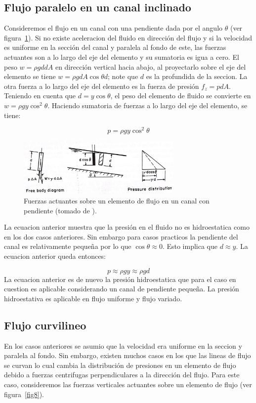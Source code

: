 \documentclass[11pt, oneside]{article}
\begin{document}
\subsection{Flujo paralelo en un canal inclinado}
Consideremos el flujo en un canal con una pendiente dada por el angulo $\theta$ (ver figura~\ref{fig7}). Si no existe aceleracion del fluido en direcci\'on del flujo y si la velocidad es uniforme en la secci\'on del canal y paralela al fondo de este, las fuerzas actuantes son a lo largo del eje del elemento y su sumatoria es igua a cero. El peso  $w=\rho g d dA$ en direcci\'on vertical hacia abajo, al proyectarlo sobre el eje del elemento se tiene $w=\rho g dA \cos \theta d$; note que $d$ es la profundida de la seccion. La otra fuerza a lo largo del eje del elemento es la fuerza de presi\'on $f_z=p dA$. Teniendo en cuenta que $d= y \cos \theta$, el peso del elemento de fluido se convierte en $w = \rho g y \cos^2 \theta$. Haciendo sumatoria de fuerzas a lo largo del eje del elemento, se tiene:

$$
p=\rho g y \cos^2 \theta
$$

\begin{figure}[h]
\centering
\includegraphics[width=8cm]{fig7.jpeg}
\caption{Fuerzas actuantes sobre un elemento de flujo en un canal con pendiente (tomado de \cite{Chau}).}
\label{fig7}
\end{figure}


La ecuacion anterior muestra que la presi\'on en el fluido no es hidroestatica como en los dos casos anteriores. Sin embargo para casos practicos la pendiente del canal es relativamente pequeña por lo que $\cos \theta \approx 0$. Esto implica que $d \approx y$. La ecuacion anterior queda entonces:

$$
p \approx \rho g y \approx \rho g d
$$
La ecuacion anterior es de nuevo la presi\'on hidroestatica que para el caso en cuestion es aplicable considerando un canal de pendiente pequeña. La presi\'on hidroestativa es aplicable en flujo uniforme y flujo variado.


\subsection{Flujo curvilineo}
En los casos anteriores se asumio que la velocidad era uniforme en la seccion y paralela al fondo. Sin embargo, existen muchos casos en los que las lineas de flujo se curvan lo cual cambia la distribuci\'on de presiones en un elemento de flujo debido a fuerzas centrifugas perpendiculares a la direcci\'on del flujo. Para este caso, consideremos las fuerzas verticales actuantes sobre un elemento de flujo (ver figura~\ref{fig8}).
\end{document}
